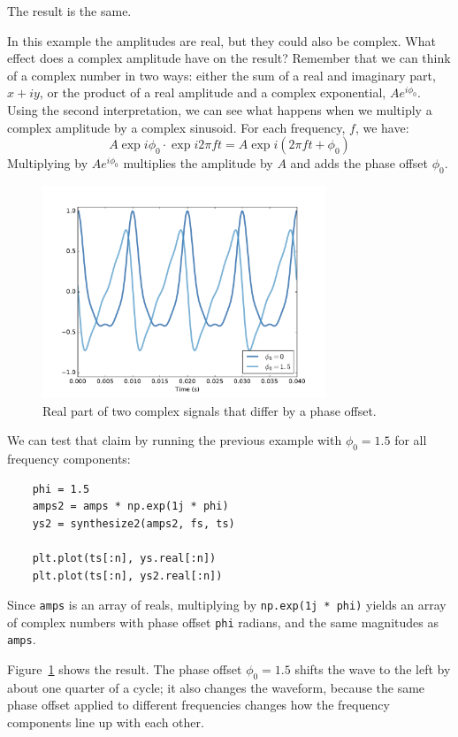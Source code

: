 \documentclass[12pt]{book}
\begin{document}
The result is the same.

In this example the amplitudes are real, but they could also be
complex.  What effect does a complex amplitude have on the result?
Remember that we can think of a complex number in two ways: either the
sum of a real and imaginary part, $x + i y$, or the product of a real
amplitude and a complex exponential, $A e^{i \phi_0}$.  Using the
second interpretation, we can see what happens when we multiply
a complex amplitude by a complex sinusoid.  For each frequency, $f$,
we have:
%
\[ A \exp{i \phi_0} \cdot \exp{i 2 \pi f t} = A \exp{i (2 \pi f t + \phi_0)} \]
%
Multiplying by $A e^{i \phi_0}$ multiplies the amplitude by $A$
and adds the phase offset $\phi_0$.

\begin{figure}
\centerline{\includegraphics[height=2.5in]{figs/dft2.pdf}}
\caption{Real part of two complex signals that differ by a phase
offset.}
\label{fig.dft2}
\end{figure}

We can test that claim by running the previous example with
$\phi_0 = 1.5$ for all frequency components:

\begin{verbatim}
    phi = 1.5
    amps2 = amps * np.exp(1j * phi)
    ys2 = synthesize2(amps2, fs, ts)

    plt.plot(ts[:n], ys.real[:n])
    plt.plot(ts[:n], ys2.real[:n])
\end{verbatim}

Since {\tt amps}
is an array of reals, multiplying by {\tt np.exp(1j * phi)} yields
an array of complex numbers with phase offset {\tt phi} radians, and
the same magnitudes as {\tt amps}.

Figure~\ref{fig.dft2} shows the result.  The phase offset
$\phi_0 = 1.5$ shifts the wave to the left by about one quarter of
a cycle; it also changes the waveform, because the same phase
offset applied to different frequencies changes how the frequency
components line up with each other.
\end{document}
